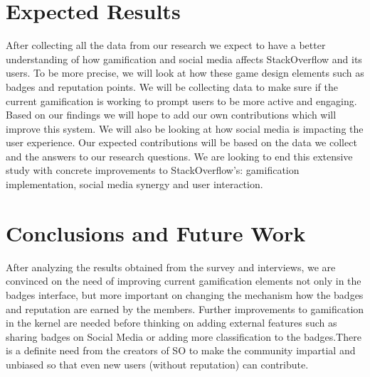 \documentclass{sigchi}
\begin{document}
\section{Expected Results}

After collecting all the data from our research we expect to have a better
understanding of how gamification and social media affects StackOverflow and
its users. To be more precise, we will look at how these game design elements
such as badges and reputation points. We will be collecting data to make sure
if the current gamification is working to prompt users to be more active and
engaging. Based on our findings we will hope to add our own contributions
which will improve this system. We will also be looking at how social media is
impacting the user experience. Our expected contributions will be based on the
data we collect and the answers to our research questions. We are looking to
end this extensive study with concrete improvements to StackOverflow’s:
gamification implementation, social media synergy and user interaction.



\section{Conclusions and Future Work}

After analyzing the results obtained from the survey and interviews, we are convinced on the need of improving current gamification elements not only in the badges interface, but more important on changing the mechanism how the badges and reputation are earned by the members. Further improvements to gamification in the kernel are needed before thinking on adding external features such as sharing badges on Social Media or adding more classification to the badges.There is a definite need from the creators of SO to make the community impartial and unbiased so that even new users (without reputation) can contribute.  


% 
% 
\end{document}
